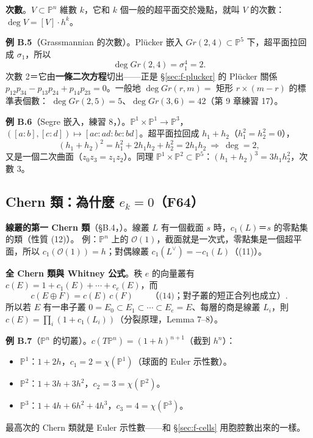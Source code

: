 \textbf{次數}。$V\subset\mathbb P^n$ 維數 $k$，它和 $k$ 個一般的超平面交於幾點，就叫 $V$ 的次數：$\deg V=[V]\cdot h^k$。

\textbf{例 B.5}（Grassmannian 的次數）。Plücker 嵌入 $Gr(2,4)\subset\mathbb P^5$ 下，超平面拉回成 $\sigma_1$，所以
\[
\deg Gr(2,4)=\sigma_1^4=2 .
\]
次數 2＝它由\textbf{一條二次方程}切出——正是 \S\ref{sec:f-plucker} 的 Plücker 關係 $p_{12}p_{34}-p_{13}p_{24}+p_{14}p_{23}=0$。一般地 $\deg Gr(r,m)=$ 矩形 $r\times(m-r)$ 的標準表個數：
$\deg Gr(2,5)=5$、$\deg Gr(3,6)=42$（第 9 章練習 17）。

\textbf{例 B.6}（Segre 嵌入，練習 8，）。$\mathbb P^1\times\mathbb P^1\to\mathbb P^3$，$([a:b],[c:d])\mapsto[ac:ad:bc:bd]$。超平面拉回成 $h_1+h_2$（$h_1^2=h_2^2=0$），
\[
(h_1+h_2)^2=h_1^2+2h_1h_2+h_2^2=2h_1h_2\ \Longrightarrow\ \deg=2 ,
\]
又是一個二次曲面（$z_0z_3=z_1z_2$）。同理 $\mathbb P^1\times\mathbb P^2\subset\mathbb P^5$：$(h_1+h_2)^3=3h_1h_2^2$，次數 3。

\subsection{Chern 類：為什麼 $e_k=0$（F64）}\label{sec:f-chern}

\textbf{線叢的第一 Chern 類}（\S B.4，）。線叢 $L$ 有一個截面 $s$ 時，$c_1(L)$＝$s$ 的零點集的類（性質 (12)）。
例：$\mathbb P^n$ 上的 $\mathcal O(1)$，截面就是一次式，零點集是一個超平面，所以 $c_1(\mathcal O(1))=h$；對偶線叢 $c_1(L^\vee)=-c_1(L)$（(11)）。

\textbf{全 Chern 類與 Whitney 公式}。秩 $e$ 的向量叢有 $c(E)=1+c_1(E)+\cdots+c_e(E)$，而
\[
c(E\oplus F)=c(E)\,c(F)\qquad\text{（(14)；對子叢的短正合列也成立）}.
\]
所以若 $E$ 有一串子叢 $0=E_0\subset E_1\subset\cdots\subset E_e=E$、每層的商是線叢 $L_i$，則 $c(E)=\prod_i(1+c_1(L_i))$（分裂原理，Lemma 7--8）。

\textbf{例 B.7}（$\mathbb P^n$ 的切叢）。$c(T\mathbb P^n)=(1+h)^{n+1}$（截到 $h^n$）：
\begin{itemize}[nosep]
\item $\mathbb P^1$：$1+2h$，$c_1=2=\chi(\mathbb P^1)$（球面的 Euler 示性數）。
\item $\mathbb P^2$：$1+3h+3h^2$，$c_2=3=\chi(\mathbb P^2)$。
\item $\mathbb P^3$：$1+4h+6h^2+4h^3$，$c_3=4=\chi(\mathbb P^3)$。
\end{itemize}
最高次的 Chern 類就是 Euler 示性數——和 \S\ref{sec:f-cells} 用胞腔數出來的一樣。

